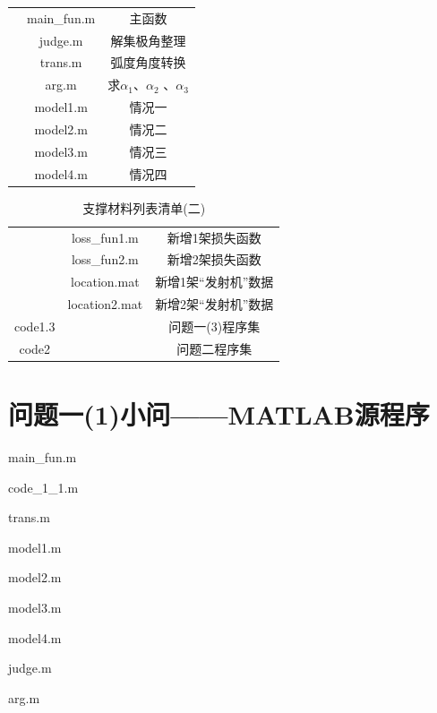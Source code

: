 \documentclass[withoutpreface,bwprint]{cumcmthesis}
\begin{document}
\begin{appendices}
\begin{table}[htbp]
\begin{tabular}{ccc}
				&main\_fun.m  & 主函数\\
				
				&judge.m  & 解集极角整理\\
				
				&trans.m  & 弧度角度转换 \\
				&arg.m & 求$\alpha_{1}$、$\alpha_{2}$ 、$\alpha_{3}$  \\
				&model1.m  & 情况一 \\
				&model2.m  & 情况二 \\
				&model3.m  & 情况三 \\
				&model4.m  & 情况四 \\
				
				\bottomrule
			\end{tabular}%
			\label{tab:addlabel}%
		\end{table}%
		\begin{table}[htbp]
			\renewcommand\arraystretch{0.1}
			\tabcolsep=0.2cm
			\centering
			\caption{支撑材料列表清单(二)}
			\begin{tabular}{ccc}
				\toprule[1.5pt]
				\makebox[0.27\textwidth][c]{文件夹名}	& \makebox[0.3\textwidth][c]{文件夹内容}	& \makebox[0.4\textwidth][c]{文件描述} \\ 
				\midrule
				&loss\_fun1.m  & 新增1架损失函数\\
				&loss\_fun2.m  & 新增2架损失函数\\
				&location.mat  & 新增1架“发射机”数据 \\
				&location2.mat  & 新增2架“发射机”数据 \\
				code1.3	& & 问题一(3)程序集 \\
				code2	& & 问题二程序集 \\
				\bottomrule
			\end{tabular}%
			\label{tab:addlabel}%
		\end{table}%
		
		
		\section{问题一(1)小问——MATLAB源程序}
		main\_fun.m
		
		code\_1\_1.m
			
		trans.m
		
		model1.m
		
		model2.m
		
		model3.m
		
		model4.m
		
		judge.m
		
		arg.m
		

\end{appendices}
\end{document}
